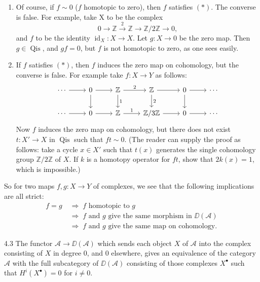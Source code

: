 \begin{enumerate}
\item[1.] Of course, if $f\sim 0$ ($f$ homotopic to zero), then $f$ satisfies $(*)$. The converse is false. For example, take X to be the complex
\[
0\to\mathbb{Z}\xrightarrow{2}\mathbb{Z}\to\mathbb{Z}/2\mathbb{Z}\to 0,
\]
and $f$ to be the identity $\operatorname{id}_{X}\colon X\to X$. Let $g\colon X\to 0$ be the zero map. Then $g\in\operatorname{Qis}$, and $gf=0$, but $f$ is not homotopic to zero, as one sees easily.

\item[2.] If $f$ satisfies $(*)$, then $f$ induces the zero map on cohomology, but the converse is false. For example take $f\colon X\to Y$ as follows:
\[
\begin{tikzcd}
\cdots \arrow[r] & 0 \arrow[r] \arrow[d] & \mathbb{Z} \arrow[r, "2"] \arrow[d, "1"] & \mathbb{Z} \arrow[r] \arrow[d,"2"] & 0 \arrow[r] \arrow[d] & \cdots \\
\cdots \arrow[r] & 0 \arrow[r] & \mathbb{Z} \arrow[r, "1"] & \mathbb{Z}/3\mathbb{Z} \arrow[r] & 0 \arrow[r] & \cdots
\end{tikzcd}
\]
Now $f$ induces the zero map on cohomology, but there does not exist $t\colon X'\to X$ in $\operatorname{Qis}$ such that $ft\sim 0$. (The reader can supply the proof as follows: take a cycle $x\in X'$ such that $t(x)$ generates the single cohomology group $\mathbb{Z}/2\mathbb{Z}$ of $X$. If $k$ is a homotopy operator for $ft$, show that $2k(x)=1$, which is impossible.)
\end{enumerate}

So for two maps $f,g\colon X\to Y$ of complexes, we see that the following implications are all strict:
\[
\begin{aligned}
f=g
&\;\Longrightarrow\; f\text{ homotopic to }g \\
&\;\Longrightarrow\; f\text{ and }g\text{ give the same morphism in }\DD(\mathcal{A}) \\
&\;\Longrightarrow\; f\text{ and }g\text{ give the same map on cohomology}.
\end{aligned}
\]

\begin{bookproposition}{4.3}\label{prop:1.4.3}
The functor $\mathcal{A}\to\DD(\mathcal{A})$ which sends each object $X$ of $\mathcal{A}$ into the complex consisting of $X$ in degree $0$, and $0$ elsewhere, gives an equivalence of the category $\mathcal{A}$ with the full subcategory of $\DD(\mathcal{A})$ consisting of those complexes $X^\bullet$ such that $H^i(X^\bullet)=0$ for $i\neq 0$.
\end{bookproposition}

